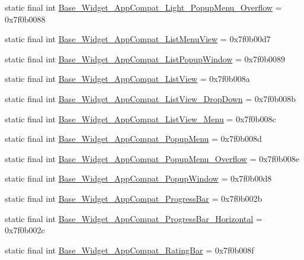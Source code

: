 \begin{CompactItemize}
\item 
static final int \hyperlink{classandroid_1_1support_1_1v7_1_1palette_1_1_r_1_1style_e5a78657db46ad6157090c36cb3d0b5f}{Base\_\-Widget\_\-AppCompat\_\-Light\_\-PopupMenu\_\-Overflow} = 0x7f0b0088
\item 
static final int \hyperlink{classandroid_1_1support_1_1v7_1_1palette_1_1_r_1_1style_7760424b544d876cddab40097b6d4c54}{Base\_\-Widget\_\-AppCompat\_\-ListMenuView} = 0x7f0b00d7
\item 
static final int \hyperlink{classandroid_1_1support_1_1v7_1_1palette_1_1_r_1_1style_67785f1f5ecdcb7ced6543c0c2b25869}{Base\_\-Widget\_\-AppCompat\_\-ListPopupWindow} = 0x7f0b0089
\item 
static final int \hyperlink{classandroid_1_1support_1_1v7_1_1palette_1_1_r_1_1style_36a90e6ce8547c7cd0ead90fe866995e}{Base\_\-Widget\_\-AppCompat\_\-ListView} = 0x7f0b008a
\item 
static final int \hyperlink{classandroid_1_1support_1_1v7_1_1palette_1_1_r_1_1style_9b63c53657d78d65a2bbdedf35060149}{Base\_\-Widget\_\-AppCompat\_\-ListView\_\-DropDown} = 0x7f0b008b
\item 
static final int \hyperlink{classandroid_1_1support_1_1v7_1_1palette_1_1_r_1_1style_69070db4cee98386f5cfad1741bf8681}{Base\_\-Widget\_\-AppCompat\_\-ListView\_\-Menu} = 0x7f0b008c
\item 
static final int \hyperlink{classandroid_1_1support_1_1v7_1_1palette_1_1_r_1_1style_cbf4468e043f0cf6bfeb6f4489633476}{Base\_\-Widget\_\-AppCompat\_\-PopupMenu} = 0x7f0b008d
\item 
static final int \hyperlink{classandroid_1_1support_1_1v7_1_1palette_1_1_r_1_1style_b205ec00e790a979d6898cb0e8cfbf2f}{Base\_\-Widget\_\-AppCompat\_\-PopupMenu\_\-Overflow} = 0x7f0b008e
\item 
static final int \hyperlink{classandroid_1_1support_1_1v7_1_1palette_1_1_r_1_1style_ac5f01fa3dd2172e95a6314e9ff0e754}{Base\_\-Widget\_\-AppCompat\_\-PopupWindow} = 0x7f0b00d8
\item 
static final int \hyperlink{classandroid_1_1support_1_1v7_1_1palette_1_1_r_1_1style_8d9058c836508a7ca8ce4a194733e6e4}{Base\_\-Widget\_\-AppCompat\_\-ProgressBar} = 0x7f0b002b
\item 
static final int \hyperlink{classandroid_1_1support_1_1v7_1_1palette_1_1_r_1_1style_ec6ac2ad9a62a8e1dff42059fa52658c}{Base\_\-Widget\_\-AppCompat\_\-ProgressBar\_\-Horizontal} = 0x7f0b002c
\item 
static final int \hyperlink{classandroid_1_1support_1_1v7_1_1palette_1_1_r_1_1style_cb3f985b66db21b4ac283c67b7ad45f8}{Base\_\-Widget\_\-AppCompat\_\-RatingBar} = 0x7f0b008f

\end{CompactItemize}
